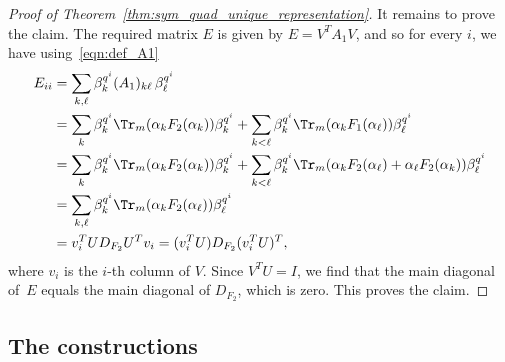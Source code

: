 \begin{proof}[Proof of Theorem~\ref{thm:sym_quad_unique_representation}]
It remains to prove the claim. The required matrix $E$ is given by $E=V^TA_1V$, and so for every $i$, we have using~\eqref{eqn:def_A1}
\begin{align*}
E_{ii}&=\sum_{k,\ell}\beta_k^{q^i}(A_1)_{k\ell}\,\beta_\ell^{q^i}\\
&=\sum_k\beta_k^{q^i}\Tr_m(\alpha_kF_2(\alpha_k))\beta_k^{q^i}+\sum_{k<\ell}\beta_k^{q^i}\Tr_m(\alpha_kF_1(\alpha_\ell))\beta_\ell^{q^i}\\
&=\sum_k\beta_k^{q^i}\Tr_m(\alpha_kF_2(\alpha_k))\beta_k^{q^i}+\sum_{k<\ell}\beta_k^{q^i}\Tr_m(\alpha_kF_2(\alpha_\ell)+\alpha_\ell F_2(\alpha_k))\beta_\ell^{q^i}\\
%
&=\sum_{k,\ell}\beta_k^{q^i}\Tr_m(\alpha_kF_2(\alpha_\ell))\beta_\ell^{q^i}\\
&=v_i^TUD_{F_2}U^Tv_i=(v_i^TU)D_{F_2}(v_i^TU)^T,
\end{align*}
where $v_i$ is the $i$-th column of $V$. Since $V^TU=I$, we find that the main diagonal of~$E$ equals the main diagonal of $D_{F_2}$, which is zero. This proves the claim.
\end{proof}
\par

%

\subsection{The constructions}


